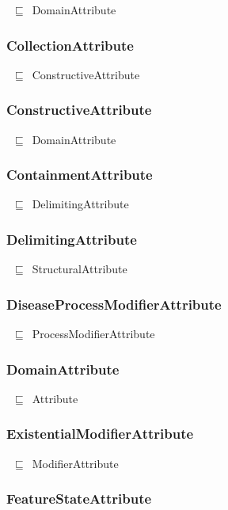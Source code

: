 \documentclass{article}
\begin{document}
~\ensuremath{\sqsubseteq}~DomainAttribute

\subsubsection*{CollectionAttribute}

~\ensuremath{\sqsubseteq}~ConstructiveAttribute

\subsubsection*{ConstructiveAttribute}

~\ensuremath{\sqsubseteq}~DomainAttribute

\subsubsection*{ContainmentAttribute}

~\ensuremath{\sqsubseteq}~DelimitingAttribute

\subsubsection*{DelimitingAttribute}

~\ensuremath{\sqsubseteq}~StructuralAttribute

\subsubsection*{DiseaseProcessModifierAttribute}

~\ensuremath{\sqsubseteq}~ProcessModifierAttribute

\subsubsection*{DomainAttribute}

~\ensuremath{\sqsubseteq}~Attribute

\subsubsection*{ExistentialModifierAttribute}

~\ensuremath{\sqsubseteq}~ModifierAttribute

\subsubsection*{FeatureStateAttribute}
\end{document}
